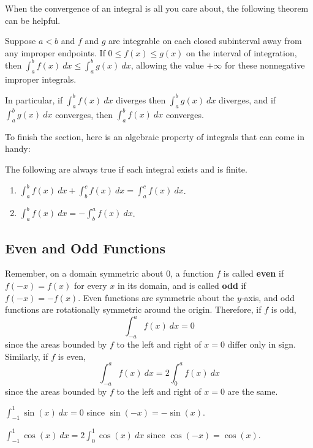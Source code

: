 When the convergence of an integral is all you care about, the following theorem can be helpful.

\begin{thm}
Suppose $a<b$ and $f$ and $g$ are integrable on each closed subinterval away
from any improper endpoints. If $0\leq f(x)\leq g(x)$ on the interval of
integration, then $\int_a^b f(x)\ dx\leq\int_a^b g(x)\ dx$, allowing
the value $+\infty$ for these nonnegative improper integrals.
\end{thm}
In particular, if $\int_a^b f(x)\ dx$ diverges then $\int_a^b g(x)\ dx$ diverges, and if $\int_a^b g(x)\ dx$ converges, then $\int_a^b f(x)\ dx$ converges.

\vspace{1em}

To finish the section, here is an algebraic property of integrals that can come in handy:
\begin{thm}
 The following are always true if each integral exists and is finite.
\begin{enumerate}
\item $\displaystyle\int_a^bf(x)\ dx + \int_b^cf(x)\ dx = \int_a^c f(x)\ dx$.
\item $\displaystyle\int_a^bf(x)\ dx = -\int_b^a f(x)\ dx$.
\end{enumerate}
\end{thm}


\subsection{Even and Odd Functions}

Remember, on a domain symmetric about 0, a function $f$ is called \textbf{even} if $f(-x)=f(x)$ for every $x$ in its domain, and is called \textbf{odd} if $f(-x)=-f(x)$. Even functions are symmetric about the $y$-axis, and odd functions are rotationally symmetric around the origin. Therefore, if $f$ is odd,
$$\int_{-a}^af(x)\ dx = 0$$
since the areas bounded by $f$ to the left and right of $x=0$ differ only in sign. Similarly, if $f$ is even,
$$\int_{-a}^af(x)\ dx = 2\int_{0}^af(x)\ dx$$
since the areas bounded by $f$ to the left and right of $x=0$ are the same.
\begin{exampleblock}
$\int_{-1}^1\sin(x)\ dx = 0$ since $\sin(-x)=-\sin(x)$.
\end{exampleblock}
\begin{exampleblock}
$\int_{-1}^1\cos(x)\ dx = 2\int_0^1\cos(x)\ dx$ since $\cos(-x)=\cos(x)$.
\end{exampleblock}
